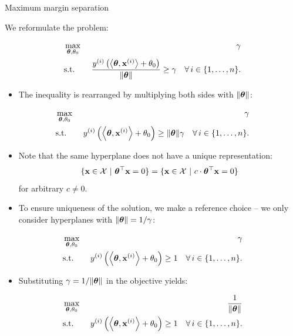 \documentclass[11pt,compress,t,notes=noshow, xcolor=table]{beamer}
\begin{document}
\begin{vbframe}{Maximum margin separation}

We reformulate the problem:

\begin{eqnarray*}
   & \max \limits_{\bm{\theta}, \theta_0} & \gamma \\
   & \text{s.t.} & \,\, \frac{y^{(i)} \left( \left\langle \bm{\theta}, \mathbf{x}^{(i)} \right\rangle + \theta_0 \right)}{\|\bm{\theta}\|} \geq \gamma \quad \forall\, i \in \{1, \ldots, n\}.
\end{eqnarray*}

\begin{itemize}
  \item The inequality is rearranged by multiplying both sides with $\|\bm{\theta}\|$:
\end{itemize}

\begin{eqnarray*}
   & \max \limits_{\bm{\theta}, \theta_0} & \gamma \\
   & \text{s.t.} & \,\,y^{(i)}  \left( \left\langle \bm{\theta}, \mathbf{x}^{(i)} \right\rangle + \theta_0 \right) \geq \|\bm{\theta}\| \gamma \quad \forall\, i \in \{1, \ldots, n\}.
\end{eqnarray*}

\framebreak

  \begin{itemize}
    \item Note that the same hyperplane does not have a unique representation:
    $$
      \{\mathbf{x} \in \mathcal{X} ~|~ \bm{\theta}^\top \mathbf{x} = 0\} = \{\mathbf{x} \in \mathcal{X} ~|~ c \cdot \bm{\theta}^\top \mathbf{x} = 0\}
    $$
    for arbitrary $c \ne 0$.
    \item To ensure uniqueness of the solution, we make a reference choice -- we only consider hyperplanes with $\|\bm{\theta}\| = 1 / \gamma$:
  \end{itemize}

  \begin{eqnarray*}
     & \max \limits_{\bm{\theta}, \theta_0} & \gamma \\
     & \text{s.t.} & \,\,y^{(i)}  \left( \left\langle \bm{\theta}, \mathbf{x}^{(i)} \right\rangle + \theta_0 \right) \geq 1 \quad \forall\, i \in \{1, \ldots, n\}.
  \end{eqnarray*}

\framebreak

  \begin{itemize}
    \item Substituting $\gamma = 1 / \|\bm{\theta}\|$ in the objective yields:
  \end{itemize}

  \begin{eqnarray*}
     & \max \limits_{\bm{\theta}, \theta_0} & \frac{1}{\|\bm{\theta}\|} \\
     & \text{s.t.} & \,\,y^{(i)}  \left( \left\langle \bm{\theta}, \mathbf{x}^{(i)} \right\rangle + \theta_0 \right) \geq 1 \quad \forall\, i \in \{1, \ldots, n\}.
  \end{eqnarray*}


\end{vbframe}
\end{document}
